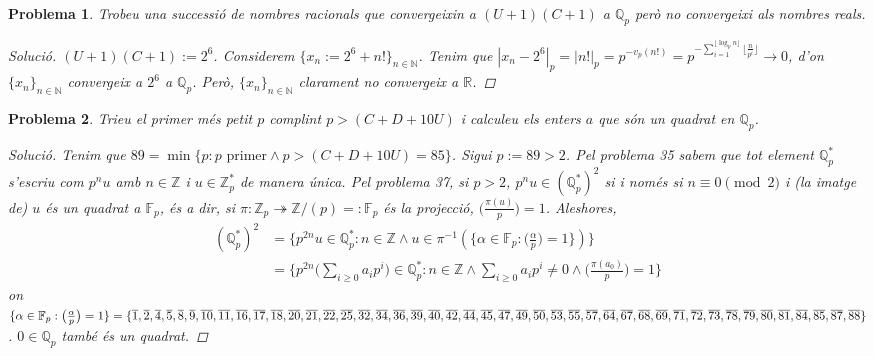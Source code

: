\documentclass[compress]{article}
\newtheorem{problema}{Problema}
\theoremstyle{definition}
\begin{document}
\begin{problema}
    Trobeu una successió de nombres racionals que convergeixin a $(U+1)(C+1)$ a $\mathbb{Q}_{p}$ però no convergeixi als nombres reals.
    \begin{proof}[Solució]
        $(U+1)(C+1):=2^{6}$. Considerem $\{x_{n}:=2^{6}+n!\}_{n\in\mathbb{N}}$. Tenim que $|x_{n}-2^{6}|_{p}
            =|n!|_{p}
            =p^{-v_{p}(n!)}
            =p^{-\sum_{i=1}^{\lfloor\log_{p}{n}\rfloor}\lfloor\frac{n}{p^{i}}\rfloor}\rightarrow0$, d'on $\{x_{n}\}_{n\in\mathbb{N}}$ convergeix a $2^{6}$ a $\mathbb{Q}_{p}$. Però, $\{x_{n}\}_{n\in\mathbb{N}}$ clarament no convergeix a $\mathbb{R}$.
    \end{proof}
\end{problema}
\begin{problema}
    Trieu el primer més petit $p$ complint $p>(C+D+10U)$ i calculeu els enters $a$ que són un quadrat en $\mathbb{Q}_{p}$.
    \begin{proof}[Solució]
        Tenim que $89=\min\{p:p\textrm{ primer}\land p>(C+D+10U)=85\}$. Sigui $p:=89>2$. Pel problema 35 sabem que tot element $\mathbb{Q}_{p}^{*}$ s'escriu com $p^{n}u$ amb $n\in\mathbb{Z}$ i $u\in\mathbb{Z}_{p}^{*}$ de manera única. Pel problema 37, si $p>2$, $p^{n}u\in(\mathbb{Q}_{p}^{*})^{2}$ si i només si $n\equiv0\pmod{2}$ i (la imatge de) $u$ és un quadrat a $\mathbb{F}_{p}$, és a dir, si $\pi:\mathbb{Z}_{p}\twoheadrightarrow\mathbb{Z}/(p)=:\mathbb{F}_{p}$ és la projecció, $\big(\frac{\pi(u)}{p}\big)=1$. Aleshores,
        \begin{align*}
            (\mathbb{Q}_{p}^{*})^{2}
            &=\{p^{2n}u\in\mathbb{Q}_{p}^{*}:
            n\in\mathbb{Z}
            \land u\in\pi^{-1}(\{\alpha\in\mathbb{F}_{p}:\big(\tfrac{\alpha}{p}\big)=1\})\}\\
            &=\{p^{2n}\big(\textstyle{\sum_{i\geq0}a_{i}p^{i}}\big)\in\mathbb{Q}_{p}^{*}:
            n\in\mathbb{Z}
            \land\textstyle{\sum_{i\geq0}a_{i}p^{i}}\neq0
            \land\big(\tfrac{\pi(a_{0})}{p}\big)=1\}
        \end{align*}
        on $\{\alpha\in\mathbb{F}_{p}:\big(\frac{\alpha}{p}\big)=1\}=\{\overline{1},\overline{2},\overline{4},\overline{5},\overline{8},\overline{9},\overline{10},\overline{11},\overline{16},\overline{17},\overline{18},\overline{20},\overline{21},\overline{22},\overline{25},\overline{32},\overline{34},\overline{36},\overline{39},\overline{40},\overline{42},\overline{44},\overline{45},\overline{47},\overline{49},\overline{50},\overline{53},\newline
        \overline{55},\overline{57},\overline{64},\overline{67},\overline{68},\overline{69},\overline{71},\overline{72},\overline{73},\overline{78},\overline{79},\overline{80},\overline{81},\overline{84},\overline{85},\overline{87},\overline{88}\}$. $0\in\mathbb{Q}_{p}$ també és un quadrat.
    \end{proof}
\end{problema}
\end{document}
